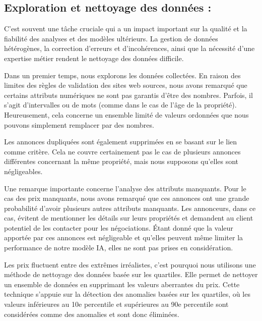 \documentclass[a4paper,12pt]{report}
\numberwithin{equation}{section}
\begin{document}
\subsection{Exploration et nettoyage des données : }
\par 
C'est souvent une tâche cruciale qui a un impact important sur la qualité et la fiabilité des analyses et des modèles ultérieurs. La gestion de données hétérogènes, la correction d'erreurs et d'incohérences, ainsi que la nécessité d'une expertise métier rendent le nettoyage des données difficile.
\\ \par
Dans un premier temps, nous explorons les données collectées. En raison des limites des règles de validation des sites web sources, nous avons remarqué que certains attributs numériques ne sont pas garantis d'être des nombres. Parfois, il s'agit d'intervalles ou de mots (comme dans le cas de l'âge de la propriété). Heureusement, cela concerne un ensemble limité de valeurs ordonnées que nous pouvons simplement remplacer par des nombres.
\\ \par 
Les annonces dupliquées sont également supprimées en se basant sur le lien comme critère. Cela ne couvre certainement pas le cas de plusieurs annonces différentes concernant la même propriété, mais nous supposons qu'elles sont négligeables.
\\ \par
Une remarque importante concerne l’analyse des attributs manquants. Pour le cas des prix manquants, nous avons remarqué que ces annonces ont une grande probabilité d’avoir plusieurs autres attributs manquants. Les annonceurs, dans ce cas, évitent de mentionner les détails sur leurs propriétés et demandent au client potentiel de les contacter pour les négociations. Étant donné que la valeur apportée par ces annonces est négligeable et qu'elles peuvent même limiter la performance de notre modèle IA, elles ne sont pas prises en considération.
\\ \par
Les prix fluctuent entre des extrêmes irréalistes, c’est pourquoi nous utilisons une méthode de nettoyage des données basée sur les quartiles. Elle permet de nettoyer un ensemble de données en supprimant les valeurs aberrantes du prix. Cette technique s'appuie sur la détection des anomalies basées sur les quartiles, où les valeurs inférieures au 10e percentile et supérieures au 90e percentile sont considérées comme des anomalies et sont donc éliminées.
\par 
\end{document}
